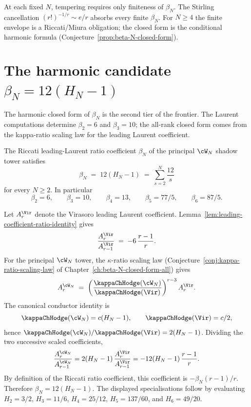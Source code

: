 \begin{remark}
\label{rem:wn-tempering-scope}
At each fixed $N$, tempering requires only finiteness of $\beta_N$.
The Stirling cancellation $(r!)^{-1/r} \sim e/r$ absorbs every finite
$\beta_N$. For $N\ge4$ the finite envelope is a Riccati/Miura
obligation; the closed form is the conditional harmonic formula
(Conjecture~\ref{prop:beta-N-closed-form}).
\end{remark}

\section{The harmonic candidate $\beta_N = 12(H_N - 1)$}
\label{sec:beta-N-closed-form}

The harmonic closed form of $\beta_N$ is the second tier of the
frontier. The Laurent computations determine $\beta_2=6$ and
$\beta_3=10$; the all-rank closed form comes from the kappa-ratio
scaling law for the leading Laurent coefficient.

\begin{conjecture}
\label{prop:beta-N-closed-form}
\ClaimStatusConjectured
The Riccati leading-Laurent ratio coefficient $\beta_N$ of the
principal $\cW_N$ shadow tower satisfies
\[
 \beta_N \;=\; 12(H_N - 1)
 \;=\; \sum_{s=2}^{N} \frac{12}{s}
\]
for every $N \ge 2$. In particular
\[
 \beta_2 = 6,\qquad
 \beta_3 = 10,\qquad
 \beta_4 = 13,\qquad
 \beta_5 = 77/5,\qquad
 \beta_6 = 87/5.
\]
\end{conjecture}

\begin{remark}
Let $A_r^{\Vir}$ denote the Virasoro leading Laurent coefficient.
Lemma~\ref{lem:leading-coefficient-ratio-identity} gives
\[
 \frac{A_r^{\Vir}}{A_{r-1}^{\Vir}}
 \;=\; -6\,\frac{r-1}{r}.
\]
For the principal $\cW_N$ tower, the $\kappa$-ratio scaling law
\textup(Conjecture~\ref{conj:kappa-ratio-scaling-law} of
Chapter~\ref{ch:beta-N-closed-form-all}\textup) gives
\[
 A_r^{\cW_N}
 \;=\;
 \left(\frac{\kappaChHodge(\cW_N)}{\kappaChHodge(\Vir)}\right)^{r-3}
 A_r^{\Vir}.
\]
The canonical conductor identity is
\[
 \kappaChHodge(\cW_N)=c(H_N-1),\qquad \kappaChHodge(\Vir)=c/2,
\]
hence $\kappaChHodge(\cW_N)/\kappaChHodge(\Vir)=2(H_N-1)$. Dividing the two
successive scaled coefficients,
\[
 \frac{A_r^{\cW_N}}{A_{r-1}^{\cW_N}}
 =
 2(H_N-1)\,\frac{A_r^{\Vir}}{A_{r-1}^{\Vir}}
 =
 -12(H_N-1)\,\frac{r-1}{r}.
\]
By definition of the Riccati ratio coefficient, this coefficient is
$-\beta_N(r-1)/r$. Therefore $\beta_N=12(H_N-1)$. The displayed
specialisations follow by evaluating
$H_2=3/2$, $H_3=11/6$, $H_4=25/12$, $H_5=137/60$, and $H_6=49/20$.
\end{remark}

